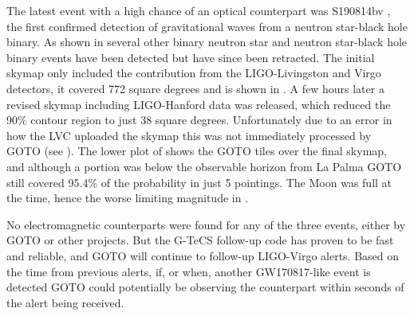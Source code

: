 \begin{colsection}
The latest event with a high chance of an optical counterpart was S190814bv \citep{S190814bv}, the first confirmed detection of gravitational waves from a neutron star-black hole binary. As shown in  several other binary neutron star and neutron star-black hole binary events have been detected but have since been retracted. The initial skymap only included the contribution from the LIGO-Livingston and Virgo detectors, it covered 772 square degrees and is shown in . A few hours later a revised skymap including LIGO-Hanford data was released, which reduced the 90\% contour region to just 38 square degrees. Unfortunately due to an error in how the LVC uploaded the skymap this was not immediately processed by GOTO (see ). The lower plot of  shows the GOTO tiles over the final skymap, and although a portion was below the observable horizon from La Palma GOTO still covered 95.4\% of the probability in just 5 pointings. The Moon was full at the time, hence the worse limiting magnitude in .

No electromagnetic counterparts were found for any of the three events, either by GOTO or other projects. But the G-TeCS follow-up code has proven to be fast and reliable, and GOTO will continue to follow-up LIGO-Virgo alerts. Based on the time from previous alerts, if, or when, another GW170817-like event is detected GOTO could potentially be observing the counterpart within seconds of the alert being received.

\newpage

\makeatletter
\setlength{\@fptop}{0pt}
\makeatother


\end{colsection}
